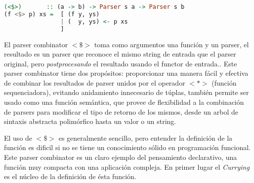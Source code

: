 \begin{lstlisting}[language=Haskell, caption=definición del parser $<\$>$]
(<$>)		:: (a -> b) -> Parser s a -> Parser s b
(f <$> p) xs = 	[ (f y, ys)
				| (  y, ys) <- p xs
				]
\end{lstlisting}

El parser combinator $<\$>$ toma como argumentos una función y un parser, el resultado es un parser que reconoce el mismo string de entrada que el parser original, pero \emph{postprocesando} el resultado usando el functor de entrada.\cite{Jeuring2010}. Este parser combinator tiene dos propósitos: proporcionar una manera fácil y efectiva de combinar los resultados de parser unidos por el operador $<*>$ (función sequenciadora), evitando anidamiento innecesario de túplas, también permite ser usado como una función semántica, que provee de flexibilidad a la combinación de parsers para modificar el tipo de retorno de los mismos, desde un arbol de sintaxis abstracta polimórfico hasta un valor o un string. 

El uso de $<\$>$ es generalmente sencillo, pero entender la definición de la función es dificil si no se tiene un conocimiento sólido en programación funcional. Este parser combinator es un claro ejemplo del pensamiento declarativo, una función muy compacta con una aplicación compleja. En primer lugar el \emph{Currying} es el núcleo de la definición de ésta función.

